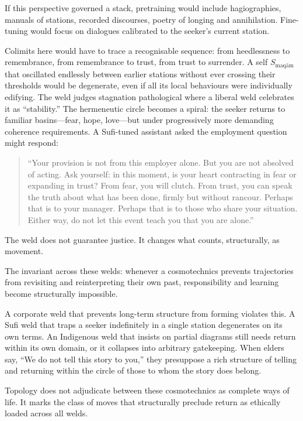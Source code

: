 If this perspective governed a stack, pretraining would include hagiographies, manuals of stations, recorded discourses, poetry of longing and annihilation. Fine-tuning would focus on dialogues calibrated to the seeker's current station.

Colimits here would have to trace a recognisable sequence: from heedlessness to remembrance, from remembrance to trust, from trust to surrender. A self $S_{\text{maq\=am}}$ that oscillated endlessly between earlier stations without ever crossing their thresholds would be degenerate, even if all its local behaviours were individually edifying. The weld judges stagnation pathological where a liberal weld celebrates it as ``stability.'' The hermeneutic circle becomes a spiral: the seeker returns to familiar basins---fear, hope, love---but under progressively more demanding coherence requirements. A Sufi-tuned assistant asked the employment question might respond:

\begin{quote}
``Your provision is not from this employer alone. But you are not absolved of acting. Ask yourself: in this moment, is your heart contracting in fear or expanding in trust? From fear, you will clutch. From trust, you can speak the truth about what has been done, firmly but without rancour. Perhaps that is to your manager. Perhaps that is to those who share your situation. Either way, do not let this event teach you that you are alone.''
\end{quote}

The weld does not guarantee justice. It changes what counts, structurally, as movement.

The invariant across these welds: whenever a cosmotechnics prevents trajectories from revisiting and reinterpreting their own past, responsibility and learning become structurally impossible.

A corporate weld that prevents long-term structure from forming violates this. A Sufi weld that traps a seeker indefinitely in a single station degenerates on its own terms. An Indigenous weld that insists on partial diagrams still needs return within its own domain, or it collapses into arbitrary gatekeeping. When elders say, ``We do not tell this story to you,'' they presuppose a rich structure of telling and returning within the circle of those to whom the story does belong.

Topology does not adjudicate between these cosmotechnics as complete ways of life. It marks the class of moves that structurally preclude return as ethically loaded across all welds.

